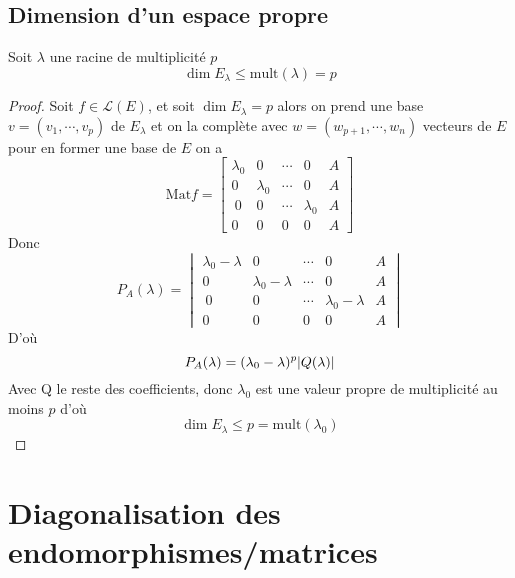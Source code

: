 \documentclass[11pt,colorlinks]{book}
\theoremstyle{mytheoremstyle}
\theoremstyle{mytheoremstyle}
\theoremstyle{mytheoremstyle}
\theoremstyle{mytheoremstyle}
\theoremstyle{mytheoremstyle}
\theoremstyle{mytheoremstyle}
\theoremstyle{mytheoremstyle}
\theoremstyle{mytheoremstyle}
\theoremstyle{myproblemstyle}
\def\mfc#1{\mathcal{#1}}
\begin{document}
\section{Dimension d'un espace propre}
\begin{theorem}
  Soit $\lambda$ une racine de multiplicité $p$ 
  \begin{equation*}
    \dim E_{\lambda} \leq \text{mult}(\lambda) = p
  \end{equation*}
  \begin{proof}
    Soit $f \in \mfc{L}(E)$, et soit $\dim E_\lambda = p$ alors on prend une base $v = (v_1,\cdots,v_p)$ de $E_\lambda$ et 
    on la complète avec $w = (w_{p+1},\cdots,w_n)$ vecteurs de $E$ pour en former une base de $E$ on a 
    \begin{equation*}
      \text{Mat} f = \begin{bmatrix}
        \lambda_0 & 0 & \cdots & 0 & A \\ 
        0 & \lambda_0 & \cdots & 0 & A \\ 
        \ 0 & 0 & \cdots & \lambda_0 & A \\ 
        0 & 0 & 0 & 0 & A
      \end{bmatrix}
    \end{equation*}
    Donc 
    \begin{equation*}
      P_A(\lambda) = \begin{vmatrix}
        \lambda_0 - \lambda & 0 & \cdots & 0 & A \\ 
        0 & \lambda_0 - \lambda & \cdots & 0 & A \\ 
        \ 0 & 0 & \cdots & \lambda_0 - \lambda & A \\ 
        0 & 0 & 0 & 0 & A
      \end{vmatrix}
    \end{equation*}
    D'où 
    \begin{equation*}
      P_A(\lambda) = (\lambda_0-\lambda)^p \abs{Q(\lambda)}
    \end{equation*}
    Avec Q le reste des coefficients, donc $\lambda_0$ est une valeur propre de multiplicité au moins $p$ d'où 
    \begin{equation*}
      \dim E_{\lambda} \leq p = \text{mult}(\lambda_0)
    \end{equation*}
  \end{proof}
\end{theorem}

\chapter{Diagonalisation des endomorphismes/matrices}
\end{document}
